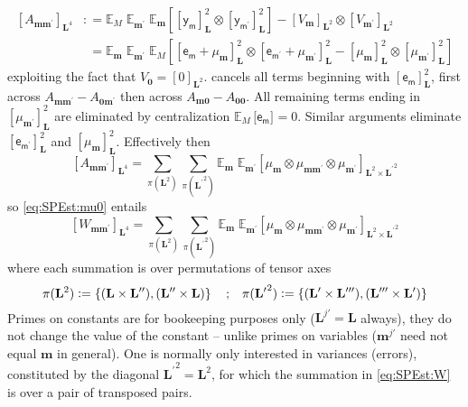 \documentclass[preprint,12pt]{elsarticle}
\newcommand*{\M}[1]{\ensuremath{#1}\xspace}
\newcommand*{\x}{\times}
\newcommand*{\mi}[1]{\mathbf{#1}}
\newcommand*{\rv}[1]{\mathsf{#1}}
\newcommand*{\te}[2][]{\left\lbrack{#2}\right\rbrack_{#1}}
\newcommand*{\tte}[2][]{\lbrack{#2}\rbrack_{#1}}
\newcommand*{\deq}{\M{\mathrel{\mathop:}=}}
\newcommand{\T}[1]{\text{#1}}
\newcommand*{\QT}[2][]{\M{\quad\T{#2}\ifthenelse{\equal{#1}{}}{\quad}{#1}}}
\newcommand*{\ev}[3][]{\mathbb{E}_{#3}^{#1}\!\left\lbrack{#2}\right\rbrack}
\newcommand*{\evt}[3][]{\mathbb{E}_{#3}^{#1}\!#2}
\newcommand*{\set}[1]{\M{\left\lbrace{#1}\right\rbrace}}
\begin{document}
    \begin{equation*}
        \begin{aligned}
            \te[\mi{L}^4]{A_{\mi{mm^{\prime}}}}
            &\deq \evt{\;\evt{\;\ev{\te[\mi{L}]{\rv{y_{m}}}^{2} \otimes \te[\mi{L}]{\rv{y_{m^{\prime}}}}^{2}}{\mi{m}}}{\mi{m^{\prime}}}}{M} - \te[\mi{L}^2]{V_{\mi{m}}}\otimes \te[\mi{L}^2]{V_{\mi{m^{\prime}}}} \\
            &\phantom{:}= \evt{\;\evt{\;\ev{
                \te[\mi{L}]{\rv{e_{m}}+\mu_{\mi{m}}}^{2} \otimes \te[\mi{L}]{\rv{e_{m^{\prime}}}+ \mu_{\mi{m^{\prime}}}}^{2} - 
                \te[\mi{L}]{\mu_{\mi{m}}}^{2} \otimes \te[\mi{L}]{\mu_{\mi{m^{\prime}}}}^{2}
            }{M}}{\mi{m^{\prime}}}}{\mi{m}}
        \end{aligned}
    \end{equation*}
    exploiting the fact that $V_{\mi{0}} = \te[\mi{L}^2]{0}$.  cancels all terms beginning with $\te[\mi{L}]{\rv{e_{m}}}^{2}$, first across $A_{\mi{mm^{\prime}}}-A_{\mi{0m^{\prime}}}$ then across $A_{\mi{m0}}-A_{\mi{00}}$. All remaining terms ending in $\te[\mi{L}]{\mu_{\mi{m^{\prime}}}}^{2}$ are eliminated by centralization $\evt{\,\tte[]{\rv{e_{m}}}}{M} = 0$.
    Similar arguments eliminate $\te[\mi{L}]{\rv{e_{m^{\prime}}}}^{2}$ and $\te[\mi{L}]{\mu_{\mi{m}}}^{2}$.
    Effectively then
    \begin{equation*}
        \te[\mi{L}^4]{A_{\mi{mm^{\prime}}}} = \sum_{\pi(\mi{L}^{2})} \sum_{\pi(\mi{L^{\prime}}^{2})}
        \evt{\;\evt{\te[\mi{L}^{2} \x \mi{L^{\prime}}^{2}]{\mu_{\mi{m}} \otimes \mu_{\mi{mm^{\prime}}} \otimes \mu_{\mi{m^{\prime}}}}}{\mi{m^{\prime}}}}{\mi{m}}
    \end{equation*}
    so \cref{eq:SPEst:mu0} entails
    \begin{equation}\label{eq:SPEst:W}
        \te[\mi{L}^4]{W_{\mi{mm^{\prime}}}} = \sum_{\pi(\mi{L}^{2})} \sum_{\pi(\mi{L^{\prime}}^{2})}
        \evt{\;\evt{\te[\mi{L}^{2} \x \mi{L^{\prime}}^{2}]{\mu_{\mi{m}} \otimes \mu_{\mi{mm^{\prime}}} \otimes \mu_{\mi{m^{\prime}}}}}{\mi{m^{\prime}}}}{\mi{m}}
    \end{equation}
    where each summation is over permutations of tensor axes
    \begin{equation*}
        \pi(\mi{L}^{2}) \deq \set{(\mi{L}\x\mi{L^{\prime\prime}}), (\mi{L^{\prime\prime}}\x\mi{L})} \QT{;} \pi(\mi{L^{\prime}}^{2}) \deq \set{(\mi{L^{\prime}}\x\mi{L^{\prime\prime\prime}}), (\mi{L^{\prime\prime\prime}}\x\mi{L^{\prime}})}
    \end{equation*}
    Primes on constants are for bookeeping purposes only ($\mi{L}^{j\prime} = \mi{L}$ always), they do not change the value of the constant -- unlike primes on variables ($\mi{m}^{j\prime}$ need not equal $\mi{m}$ in general). One is normally only interested in variances (errors), constituted by the diagonal $\mi{L^{\prime}}^{2}=\mi{L}^{2}$, for which the summation in \cref{eq:SPEst:W} is over a pair of transposed pairs.
\end{document}
